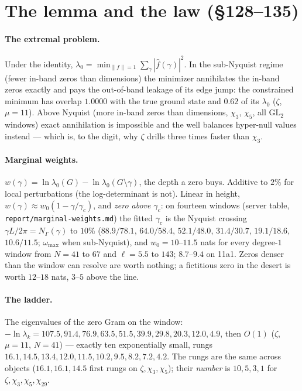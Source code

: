\documentclass[11pt]{article}
\begin{document}
\section{The lemma and the law (\S128--135)}
\paragraph{The extremal problem.} Under the identity, $\lambda_0=\min_{\|f\|=1}\sum_\gamma|\hat f(\gamma)|^2$. In the sub-Nyquist regime (fewer in-band zeros than dimensions) the minimizer annihilates the in-band zeros exactly and pays the out-of-band leakage of its edge jump: the constrained minimum has overlap $1.0000$ with the true ground state and $0.62$ of its $\lambda_0$ ($\zeta$, $\mu=11$). Above Nyquist (more in-band zeros than dimensions, $\chi_3$, $\chi_5$, all GL$_2$ windows) exact annihilation is impossible and the well balances hyper-null values instead --- which is, to the digit, why $\zeta$ drills three times faster than $\chi_3$.

\paragraph{Marginal weights.} $w(\gamma)=\ln\lambda_0(G)-\ln\lambda_0(G\setminus\gamma)$, the depth a zero buys. Additive to $2\%$ for local perturbations (the log-determinant is not). Linear in height, $w(\gamma)\approx w_0(1-\gamma/\gamma_c)$, and \emph{zero above $\gamma_c$}: on fourteen windows (server table, \texttt{report/marginal-weights.md}) the fitted $\gamma_c$ is the Nyquist crossing $\gamma L/2\pi=N_\Gamma(\gamma)$ to $10\%$ ($88.9/78.1$, $64.0/58.4$, $52.1/48.0$, $31.4/30.7$, $19.1/18.6$, $10.6/11.5$; $\omega_{\max}$ when sub-Nyquist), and $w_0=10$--$11.5$ nats for every degree-$1$ window from $N=41$ to $67$ and $\ell=5.5$ to $143$; $8.7$--$9.4$ on 11a1. Zeros denser than the window can resolve are worth nothing; a fictitious zero in the desert is worth $12$--$18$ nats, $3$--$5$ above the line.

\paragraph{The ladder.} The eigenvalues of the zero Gram on the window: $-\ln\lambda_k=107.5,91.4,76.9,63.5,51.5,39.9,29.8,20.3,12.0,4.9$, then $O(1)$ ($\zeta$, $\mu=11$, $N=41$) --- exactly ten exponentially small, rungs $16.1,14.5,13.4,12.0,11.5,10.2,9.5,8.2,7.2,4.2$. The rungs are the same across objects ($16.1,16.1,14.5$ first rungs on $\zeta,\chi_3,\chi_5$); their \emph{number} is $10,5,3,1$ for $\zeta,\chi_3,\chi_5,\chi_{29}$.
\end{document}
